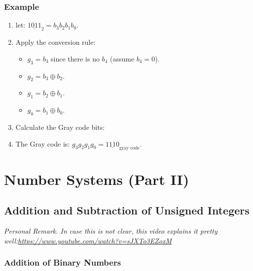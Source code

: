 \documentclass[12pt,openany, tikz,border=10pt]{book}
\newcommand*\xor{\oplus}
\begin{document}
	\subsection{Example}
	
	\begin{enumerate}
		\item[] let: \(\underline{1011}_{2} = b_3b_2b_1b_0 \).
		\item[] Apply the conversion rule:
		      \begin{itemize}
		      	\item[] \( g_3 = b_3 \) since there is no \( b_4 \) (assume \( b_4 = 0 \)).
		      	\item[] \( g_2 = b_3 \xor b_2 \).
		      	\item[] \( g_1 = b_2 \xor b_1 \).
		      	\item[] \( g_0 = b_1 \xor b_0 \).
		      \end{itemize}
		\item[] Calculate the Gray code bits:
		\item[] The Gray code is: \( g_3g_2g_1g_0 = \underline{1110}_{\text{gray code}} \).
	\end{enumerate}
	
	
	\chapter{Number Systems (Part II)}
	
	\section{Addition and Subtraction
	of Unsigned Integers}
	\textit{Personal Remark. In case this is not clear, this video explains it pretty well:\newline \url{https://www.youtube.com/watch?v=sJXTo3EZoxM}}
	\subsection{Addition of Binary Numbers}
	
\end{document}
